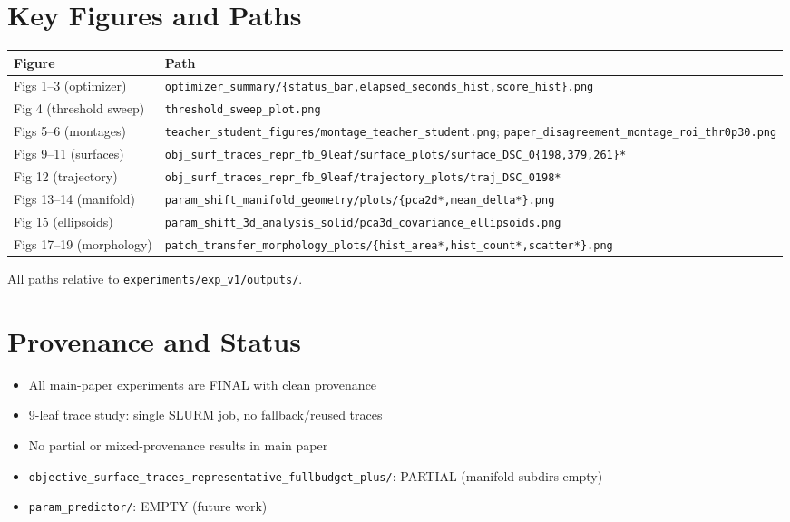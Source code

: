 \documentclass[11pt,a4paper]{article}
\newcommand{\filepath}[1]{\texttt{\small #1}}
\begin{document}
\section{Key Figures and Paths}

\begin{tabular}{p{3.5cm}p{10cm}}
\toprule
\textbf{Figure} & \textbf{Path} \\
\midrule
Figs 1--3 (optimizer) & \filepath{optimizer\_summary/\{status\_bar,elapsed\_seconds\_hist,score\_hist\}.png} \\
Fig 4 (threshold sweep) & \filepath{threshold\_sweep\_plot.png} \\
Figs 5--6 (montages) & \filepath{teacher\_student\_figures/montage\_teacher\_student.png}; \filepath{paper\_disagreement\_montage\_roi\_thr0p30.png} \\
Figs 9--11 (surfaces) & \filepath{obj\_surf\_traces\_repr\_fb\_9leaf/surface\_plots/surface\_DSC\_0\{198,379,261\}*} \\
Fig 12 (trajectory) & \filepath{obj\_surf\_traces\_repr\_fb\_9leaf/trajectory\_plots/traj\_DSC\_0198*} \\
Figs 13--14 (manifold) & \filepath{param\_shift\_manifold\_geometry/plots/\{pca2d*,mean\_delta*\}.png} \\
Fig 15 (ellipsoids) & \filepath{param\_shift\_3d\_analysis\_solid/pca3d\_covariance\_ellipsoids.png} \\
Figs 17--19 (morphology) & \filepath{patch\_transfer\_morphology\_plots/\{hist\_area*,hist\_count*,scatter*\}.png} \\
\bottomrule
\end{tabular}

All paths relative to \filepath{experiments/exp\_v1/outputs/}.

\section{Provenance and Status}

\begin{itemize}[nosep]
  \item All main-paper experiments are FINAL with clean provenance
  \item 9-leaf trace study: single SLURM job, no fallback/reused traces
  \item No partial or mixed-provenance results in main paper
  \item \filepath{objective\_surface\_traces\_representative\_fullbudget\_plus/}: PARTIAL (manifold subdirs empty)
  \item \filepath{param\_predictor/}: EMPTY (future work)
\end{itemize}
\end{document}
